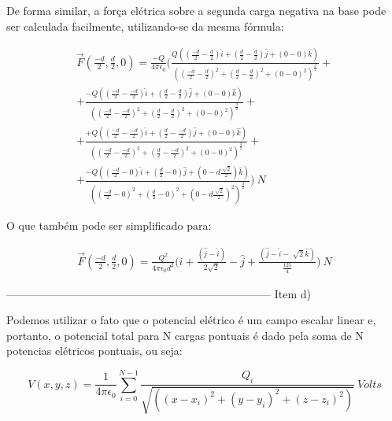 \documentclass[journal,comsoc]{IEEEtran}
\begin{document}
\par De forma similar, a força elétrica sobre a segunda carga negativa na base pode ser calculada facilmente, utilizando-se da mesma fórmula:

\begin{equation}
\begin{aligned}
    	\vec{F}(\frac{-d}{2},\frac{d}{2},0)
        = 
        \frac{-Q}{4\pi{\epsilon}_{0}}
        \Big(
        \frac
        {Q((\frac{-d}{2}-\frac{d}{2})\hat{i}+(\frac{d}{2}-\frac{d}{2})\hat{j}+(0-0)\hat{k})} 
        {((\frac{-d}{2}-\frac{d}{2})^2+(\frac{d}{2}-\frac{d}{2})^2+(0-0)^2)^\frac{3}{2}} +
     	\\
	+   \frac
        {-Q((\frac{-d}{2}-\frac{-d}{2})\hat{i}+(\frac{d}{2}-\frac{d}{2})\hat{j}+(0-0)\hat{k})} 
        {((\frac{-d}{2}-\frac{-d}{2})^2+(\frac{d}{2}-\frac{d}{2})^2+(0-0)^2)^\frac{3}{2}} +
        \\
    +   \frac
        {+Q((\frac{-d}{2}-\frac{-d}{2})\hat{i}+(\frac{d}{2}-\frac{-d}{2})\hat{j}+(0-0)\hat{k})} 
        {((\frac{-d}{2}-\frac{-d}{2})^2+(\frac{d}{2}-\frac{-d}{2})^2+(0-0)^2)^\frac{3}{2}} +
        \\
    +   \frac
        {-Q((\frac{-d}{2}-0)\hat{i}+(\frac{d}{2}-0)\hat{j}+(0-d\frac{\sqrt[]{2}}{2})\hat{k})} 
        {((\frac{-d}{2}-0)^2+(\frac{d}{2}-0)^2+(0-d\frac{\sqrt[]{2}}{2})^2)^\frac{3}{2}}
    \Big)\ N
\end{aligned}
\end{equation}

\par O que também pode ser simplificado para:

\begin{equation}
\begin{aligned}
    	\vec{F}(\frac{-d}{2},\frac{d}{2},0)
        = 
   \frac{Q^2}{4\pi{\epsilon}_{0}d^2}
        \Big(
        \hat{i} +
   \frac
        {(\hat{j}-\hat{i})} 
        {2\sqrt{2}}
   		-\hat{j} +
   \frac
        {(\hat{j}-\hat{i}-\sqrt[]{2}\hat{k})} 
        {\frac{125}{4}}
    \Big)\ N
\end{aligned}
\end{equation}


------------------------------------------------------------------------
Item d)
\par Podemos utilizar o fato que o potencial elétrico é um campo escalar linear e, portanto, o potencial total para N cargas pontuais é dado pela soma de N potencias elétricos pontuais, ou seja:

\begin{equation}
    	V(x,y,z) = \frac{1}{4\pi{\epsilon}_{0}} \sum_{i=0}^{N-1}
        \frac
        {{Q}_{i}} 
        {\sqrt{((x-{x}_{i})^2+(y-{y}_{i})^2+(z-{z}_{i})^2)}}\ Volts
\end{equation}
\end{document}
